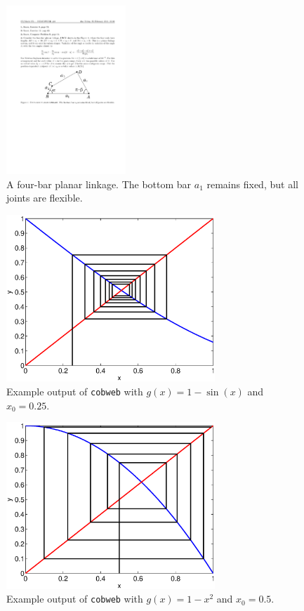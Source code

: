 \documentclass[12pt]{exam}
\begin{document}
\begin{questions}
\begin{figure}[b]
\centering
\includegraphics[width=0.4\textwidth]{linkage.pdf}
\caption{A four-bar planar linkage. The bottom bar $a_1$ remains fixed, but all joints are flexible.}\label{fig:linkage}
\end{figure}

\begin{figure}[p]
\centering
\includegraphics[width=0.7\textwidth]{cobweb_example.eps}
\caption{Example output of \texttt{cobweb} with $g(x) = 1-\sin(x)$ and $x_0 = 0.25$.}\label{fig:cobweb}
\end{figure}
\begin{figure}[p]
\centering
\includegraphics[width=0.7\textwidth]{cobweb_example2.eps}
\caption{Example output of \texttt{cobweb} with $g(x) = 1-x^2$ and $x_0 = 0.5$.}\label{fig:cobweb2}
\end{figure}

\end{questions}
\end{document}
